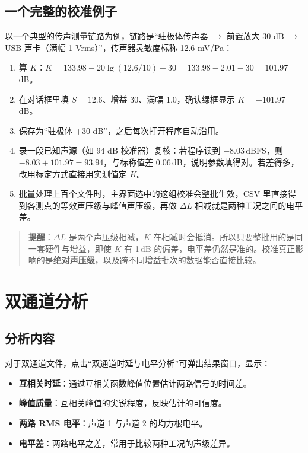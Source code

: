 \documentclass[UTF8,a4paper,12pt,scheme=chinese]{ctexart}
\begin{document}
\subsection{一个完整的校准例子}

以一个典型的传声测量链路为例，链路是“驻极体传声器 $\to$ 前置放大 30 dB $\to$ USB 声卡（满幅 1 Vrms）”，传声器灵敏度标称 12.6 mV/Pa：

\begin{enumerate}
  \item 算 $K$：$K = 133.98 - 20\lg(12.6/10) - 30 = 133.98 - 2.01 - 30 = 101.97$\,dB。
  \item 在对话框里填 $S=12.6$、增益 30、满幅 1.0，确认绿框显示 $K=+101.97$\,dB。
  \item 保存为“驻极体 +30 dB”，之后每次打开程序自动沿用。
  \item 录一段已知声源（如 94 dB 校准器）复核：若程序读到 $-8.03$\,dBFS，则 $-8.03+101.97=93.94$，与标称值差 0.06\,dB，说明参数填得对。若差得多，改用标定方式直接用实测值定 $K$。
  \item 批量处理上百个文件时，主界面选中的这组校准会整批生效，CSV 里直接得到各测点的等效声压级与峰值声压级，再做 $\Delta L$ 相减就是两种工况之间的电平差。
\end{enumerate}

\begin{quote}
\textbf{提醒}：$\Delta L$ 是两个声压级相减，$K$ 在相减时会抵消。所以只要整批用的是同一套硬件与增益，即使 $K$ 有 1\,dB 的偏差，电平差仍然是准的。校准真正影响的是\textbf{绝对声压级}，以及跨不同增益批次的数据能否直接比较。
\end{quote}

\section{双通道分析}

\subsection{分析内容}

对于双通道文件，点击“双通道时延与电平分析”可弹出结果窗口，显示：

\begin{itemize}
  \item \textbf{互相关时延}：通过互相关函数峰值位置估计两路信号的时间差。
  \item \textbf{峰值质量}：互相关峰值的尖锐程度，反映估计的可信度。
  \item \textbf{两路 RMS 电平}：声道 1 与声道 2 的均方根电平。
  \item \textbf{电平差}：两路电平之差，常用于比较两种工况的声级差异。
\end{itemize}
\end{document}
